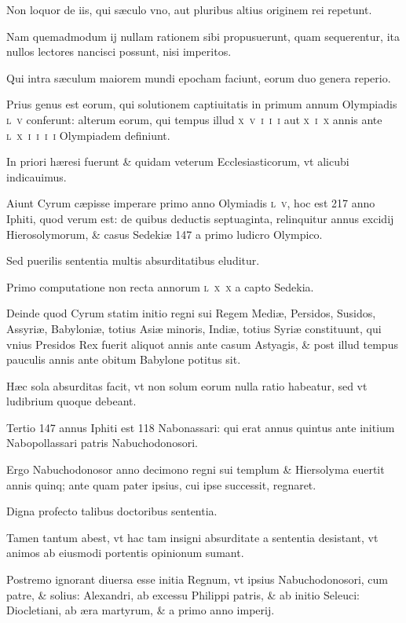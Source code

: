 \begin{parnumbers}
Non loquor de iis, qui sæculo vno, aut pluribus altius originem rei repetunt.

Nam quemadmodum ij nullam rationem sibi propusuerunt, quam sequerentur, ita nullos lectores nancisci possunt, nisi imperitos. 

Qui intra sæculum maiorem mundi epocham faciunt, eorum duo genera reperio.

Prius genus est eorum, qui solutionem captiuitatis in primum annum Olympiadis \textsc{l~v} conferunt: alterum eorum, qui tempus illud \textsc{x~v~i~i~i} aut \textsc{x~i~x} annis ante \textsc{l~x~i~i~i~i} Olympiadem definiunt.

In priori hæresi fuerunt \& quidam veterum Ecclesiasticorum, vt alicubi indicauimus. 

Aiunt Cyrum cæpisse imperare primo anno Olymiadis \textsc{l~v}, hoc est 217 anno Iphiti, quod verum est: de quibus deductis septuaginta, relinquitur annus excidij Hierosolymorum, \& casus Sedekiæ 147 a primo ludicro Olympico.

Sed puerilis sententia multis absurditatibus eluditur.

Primo computatione non recta annorum \textsc{l~x~x} a capto Sedekia.

Deinde quod Cyrum statim initio regni sui Regem Mediæ, Persidos, Susidos, Assyriæ, Babyloniæ, totius Asiæ minoris, Indiæ, totius Syriæ constituunt, qui vnius Presidos Rex fuerit aliquot annis ante casum Astyagis, \& post illud tempus pauculis annis ante obitum Babylone potitus sit.

Hæc sola absurditas facit, vt non solum eorum nulla ratio habeatur, sed vt ludibrium quoque debeant.

Tertio 147 annus Iphiti est 118 Nabonassari: qui erat annus quintus ante initium Nabopollassari patris Nabuchodonosori.

Ergo Nabuchodonosor anno decimono regni sui templum \& Hiersolyma euertit annis quinq;
ante quam pater ipsius, cui ipse successit, regnaret.

Digna profecto talibus doctoribus sententia.

Tamen tantum abest, vt hac tam insigni absurditate a sententia desistant, vt animos ab eiusmodi portentis opinionum sumant.

Postremo ignorant diuersa esse initia Regnum, vt ipsius Nabuchodonosori, cum patre, \& solius: Alexandri, ab excessu Philippi patris, \& ab initio Seleuci: Diocletiani, ab æra martyrum, \& a primo anno imperij.


\end{parnumbers}
